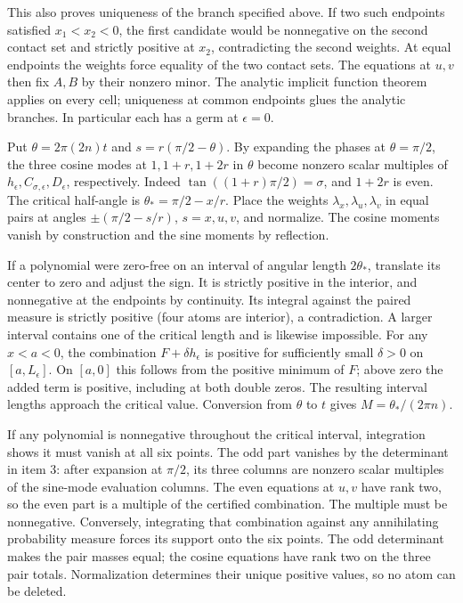 \documentclass[11pt]{article}
\begin{document}
This also proves uniqueness of the branch specified above.
If two such endpoints satisfied \(x_1<x_2<0\), the first candidate
would be nonnegative on the second contact set and strictly positive
at \(x_2\), contradicting the second weights.
At equal endpoints the weights force equality of the two contact
sets. The equations at \(u,v\) then fix \(A,B\) by their nonzero
minor. The analytic implicit function theorem applies on every
cell; uniqueness at common endpoints glues the analytic branches.
In particular each has a germ at \(\epsilon=0\).

Put \(\theta=2\pi(2n)t\) and \(s=r(\pi/2-\theta)\). By expanding
the phases at \(\theta=\pi/2\), the three cosine modes at
\(1,1+r,1+2r\) in \(\theta\) become nonzero scalar multiples of
\(h_\epsilon,C_{\sigma,\epsilon},D_\epsilon\), respectively.
Indeed \(\tan((1+r)\pi/2)=\sigma\), and \(1+2r\) is even.
The critical half-angle is \(\theta_*=\pi/2-x/r\).
Place the weights \(\lambda_x,\lambda_u,\lambda_v\) in equal pairs
at angles \(\pm(\pi/2-s/r)\), \(s=x,u,v\), and normalize.
The cosine moments vanish by construction and the sine moments
by reflection.

If a polynomial were zero-free on an interval of angular length
\(2\theta_*\), translate its center to zero and adjust the sign.
It is strictly positive in the interior, and nonnegative at the
endpoints by continuity. Its integral against the paired measure
is strictly positive (four atoms are interior), a contradiction.
A larger interval contains one of the critical length and is
likewise impossible. For any \(x<a<0\), the combination
\(F+\delta h_\epsilon\) is positive for sufficiently small
\(\delta>0\) on \([a,L_\epsilon]\). On \([a,0]\) this follows
from the positive minimum of \(F\); above zero the added term
is positive, including at both double zeros. The resulting
interval lengths approach the critical value. Conversion from
\(\theta\) to \(t\) gives \(M=\theta_*/(2\pi n)\).

If any polynomial is nonnegative throughout the critical interval,
integration shows it must vanish at all six points. The odd part
vanishes by the determinant in item 3: after expansion at \(\pi/2\),
its three columns are nonzero scalar multiples of the sine-mode
evaluation columns. The even equations at \(u,v\) have rank two,
so the even part is a multiple of the certified combination.
The multiple must be nonnegative. Conversely, integrating that
combination against any annihilating probability measure forces
its support onto the six points. The odd determinant makes the
pair masses equal; the cosine equations have rank two on the three
pair totals. Normalization determines their unique positive values,
so no atom can be deleted.
\end{document}
